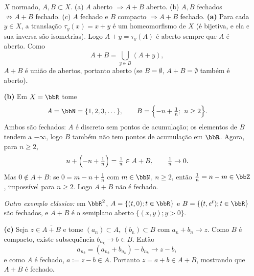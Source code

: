 \begin{exercicio}{$X$ normado, $A,B\subset X$. (a) $A$ aberto $\Rightarrow A+B$ aberto. (b) $A,B$ fechados $\not\Rightarrow A+B$ fechado. (c) $A$ fechado e $B$ compacto $\Rightarrow A+B$ fechado.}
\sol
\textbf{(a)} Para cada $y\in X$, a translação $\tau_y(x)=x+y$ é um homeomorfismo de $X$ (é bijetiva, e ela e sua inversa são isometrias). Logo $A+y=\tau_y(A)$ é aberto sempre que $A$ é aberto. Como
\[ A+B=\bigcup_{y\in B}(A+y), \]
$A+B$ é união de abertos, portanto aberto (se $B=\emptyset$, $A+B=\emptyset$ também é aberto).

\textbf{(b)} Em $X=\R$ tome
\[ A=\N=\{1,2,3,\dots\},\qquad B=\Bigl\{-n+\tfrac1n;\ n\ge2\Bigr\}. \]
Ambos são fechados: $A$ é discreto sem pontos de acumulação; os elementos de $B$ tendem a $-\infty$, logo $B$ também não tem pontos de acumulação em $\R$. Agora, para $n\ge2$,
\[ n+\Bigl(-n+\tfrac1n\Bigr)=\tfrac1n\in A+B,\qquad \tfrac1n\to0. \]
Mas $0\notin A+B$: se $0=m-n+\frac1n$ com $m\in\N$, $n\ge2$, então $\frac1n=n-m\in\Z$, impossível para $n\ge2$. Logo $A+B$ não é fechado.

\emph{Outro exemplo clássico:} em $\R^2$, $A=\{(t,0);t\in\R\}$ e $B=\{(t,e^{t});t\in\R\}$ são fechados, e $A+B$ é o semiplano aberto $\{(x,y);y>0\}$.

\textbf{(c)} Seja $z\in\overline{A+B}$ e tome $(a_n)\subset A$, $(b_n)\subset B$ com $a_n+b_n\to z$. Como $B$ é compacto, existe subsequência $b_{n_k}\to b\in B$. Então
\[ a_{n_k}=(a_{n_k}+b_{n_k})-b_{n_k}\longrightarrow z-b, \]
e como $A$ é fechado, $a:=z-b\in A$. Portanto $z=a+b\in A+B$, mostrando que $A+B$ é fechado.
\end{exercicio}

